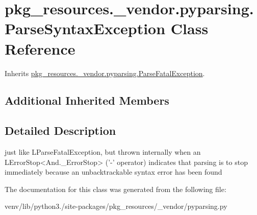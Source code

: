 \hypertarget{classpkg__resources_1_1__vendor_1_1pyparsing_1_1_parse_syntax_exception}{}\section{pkg\+\_\+resources.\+\_\+vendor.\+pyparsing.\+Parse\+Syntax\+Exception Class Reference}
\label{classpkg__resources_1_1__vendor_1_1pyparsing_1_1_parse_syntax_exception}


Inherits \hyperlink{classpkg__resources_1_1__vendor_1_1pyparsing_1_1_parse_fatal_exception}{pkg\+\_\+resources.\+\_\+vendor.\+pyparsing.\+Parse\+Fatal\+Exception}.

\subsection*{Additional Inherited Members}


\subsection{Detailed Description}
\begin{DoxyVerb}just like L{ParseFatalException}, but thrown internally when an
   L{ErrorStop<And._ErrorStop>} ('-' operator) indicates that parsing is to stop 
   immediately because an unbacktrackable syntax error has been found\end{DoxyVerb}
 

The documentation for this class was generated from the following file\+:\begin{DoxyCompactItemize}
\item 
venv/lib/python3./site-\/packages/pkg\+\_\+resources/\+\_\+vendor/pyparsing.\+py\end{DoxyCompactItemize}
